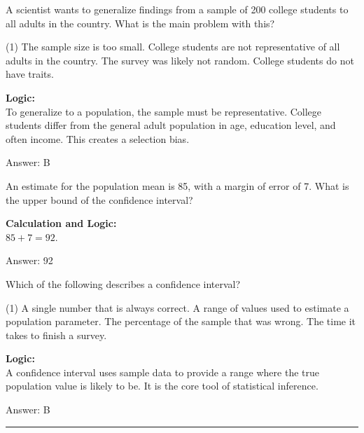 \documentclass[11pt,paper=a4,answers]{exam}
\begin{document}
\begin{questions}
\question
A scientist wants to generalize findings from a sample of 200 college students to all adults in the country. What is the main problem with this?
\begin{tasks}(1)
    \task The sample size is too small.
    \task College students are not representative of all adults in the country.
    \task The survey was likely not random.
    \task College students do not have traits.
\end{tasks}

\begin{solution}
\textbf{Logic:} \\
To generalize to a population, the sample must be representative. College students differ from the general adult population in age, education level, and often income. This creates a selection bias.

\vspace{30pt}

Answer: \colorbox{yellow!100}{B}
\end{solution}

\vspace{60pt}

\question
An estimate for the population mean is 85, with a margin of error of 7. What is the upper bound of the confidence interval?

\begin{solution}
\textbf{Calculation and Logic:} \\
$85 + 7 = 92$.

\vspace{30pt}

Answer: \colorbox{yellow!100}{92}
\end{solution}

\vspace{60pt}

\question
Which of the following describes a confidence interval?
\begin{tasks}(1)
    \task A single number that is always correct.
    \task A range of values used to estimate a population parameter.
    \task The percentage of the sample that was wrong.
    \task The time it takes to finish a survey.
\end{tasks}

\begin{solution}
\textbf{Logic:} \\
A confidence interval uses sample data to provide a range where the true population value is likely to be. It is the core tool of statistical inference.

\vspace{30pt}

Answer: \colorbox{yellow!100}{B}
\end{solution}



\end{questions}
\begin{center}
\rule{.5\textwidth}{1pt}
\end{center}
\end{document}
